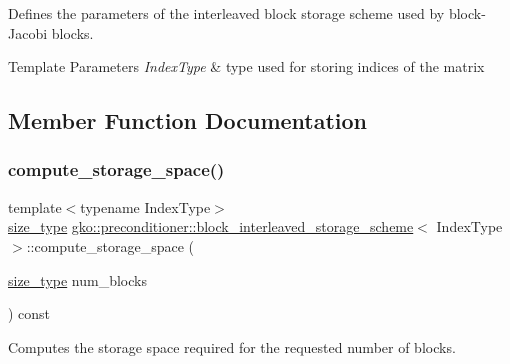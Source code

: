 Defines the parameters of the interleaved block storage scheme used by block-\/\+Jacobi blocks. 


\begin{DoxyTemplParams}{Template Parameters}
{\em Index\+Type} & type used for storing indices of the matrix \\
\hline
\end{DoxyTemplParams}


\subsection{Member Function Documentation}
\mbox{\label{structgko_1_1preconditioner_1_1block__interleaved__storage__scheme_ae46b38432c1e1b87d5743a649f2cfe84}} 
\subsubsection{\texorpdfstring{compute\+\_\+storage\+\_\+space()}{compute\_storage\_space()}}
{\footnotesize\ttfamily template$<$typename Index\+Type$>$ \\
\hyperlink{namespacegko_a6e5c95df0ae4e47aab2f604a22d98ee7}{size\+\_\+type} \hyperlink{structgko_1_1preconditioner_1_1block__interleaved__storage__scheme}{gko\+::preconditioner\+::block\+\_\+interleaved\+\_\+storage\+\_\+scheme}$<$ Index\+Type $>$\+::compute\+\_\+storage\+\_\+space (\begin{DoxyParamCaption}\item[{\hyperlink{namespacegko_a6e5c95df0ae4e47aab2f604a22d98ee7}{size\+\_\+type}}]{num\+\_\+blocks }\end{DoxyParamCaption}) const\hspace{0.3cm}{\ttfamily [noexcept]}}



Computes the storage space required for the requested number of blocks. 


